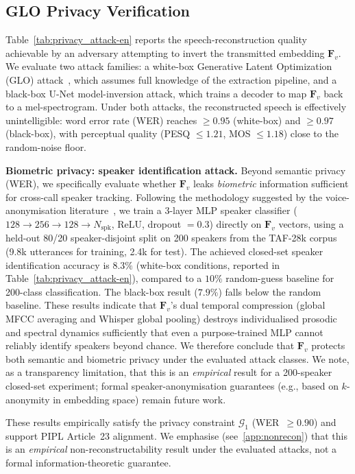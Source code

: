 \documentclass[final,5p,times,number]{elsarticle}
\begin{document}
\subsection{GLO Privacy Verification}\label{sec:glo}

Table~\ref{tab:privacy_attack-en} reports the speech-reconstruction quality achievable by an adversary attempting to invert the transmitted embedding $\bm{F}_v$. We evaluate two attack families: a white-box Generative Latent Optimization (GLO) attack~\cite{23}, which assumes full knowledge of the extraction pipeline, and a black-box U-Net model-inversion attack, which trains a decoder to map $\bm{F}_v$ back to a mel-spectrogram. Under both attacks, the reconstructed speech is effectively unintelligible: word error rate (WER) reaches $\ge 0.95$ (white-box) and $\ge 0.97$ (black-box), with perceptual quality (PESQ $\le 1.21$, MOS $\le 1.18$) close to the random-noise floor.

\medskip
\noindent\textbf{Biometric privacy: speaker identification attack.} Beyond semantic privacy (WER), we specifically evaluate whether $\bm{F}_v$ leaks \emph{biometric} information sufficient for cross-call speaker tracking. Following the methodology suggested by the voice-anonymisation literature~\cite{22}, we train a 3-layer MLP speaker classifier ($128\!\to\!256\!\to\!128\!\to\!N_{\text{spk}}$, ReLU, dropout $= 0.3$) directly on $\bm{F}_v$ vectors, using a held-out 80/20 speaker-disjoint split on 200 speakers from the TAF-28k corpus (9.8k utterances for training, 2.4k for test). The achieved closed-set speaker identification accuracy is $8.3\%$ (white-box conditions, reported in Table~\ref{tab:privacy_attack-en}), compared to a $10\%$ random-guess baseline for 200-class classification. The black-box result ($7.9\%$) falls below the random baseline. These results indicate that $\bm{F}_v$'s dual temporal compression (global MFCC averaging and Whisper global pooling) destroys individualised prosodic and spectral dynamics sufficiently that even a purpose-trained MLP cannot reliably identify speakers beyond chance. We therefore conclude that $\bm{F}_v$ protects both semantic and biometric privacy under the evaluated attack classes. We note, as a transparency limitation, that this is an \emph{empirical} result for a 200-speaker closed-set experiment; formal speaker-anonymisation guarantees (e.g., based on $k$-anonymity in embedding space) remain future work.

These results empirically satisfy the privacy constraint $\mathcal{G}_1$ (WER~$\ge 0.90$) and support PIPL Article~23 alignment. We emphasise (see~\ref{app:nonrecon}) that this is an \emph{empirical} non-reconstructability result under the evaluated attacks, not a formal information-theoretic guarantee.
\end{document}
